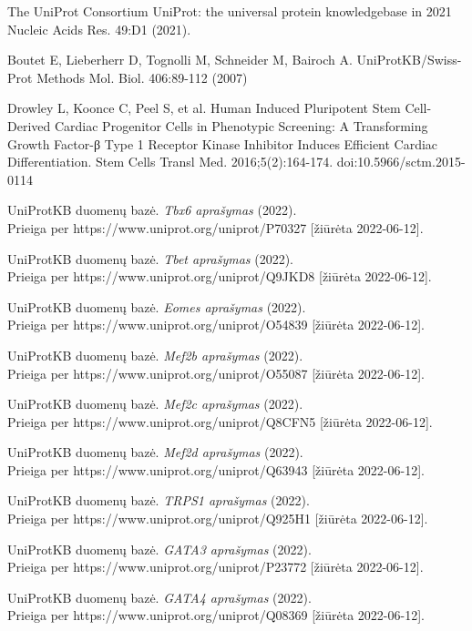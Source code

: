 \documentclass[12pt]{article}
\begin{document}
\begin{thebibliography}{99}
 The UniProt Consortium
UniProt: the universal protein knowledgebase in 2021
Nucleic Acids Res. 49:D1 (2021).

 Boutet E, Lieberherr D, Tognolli M,
Schneider M, Bairoch A. UniProtKB/Swiss-Prot
Methods Mol. Biol. 406:89-112 (2007)

 Drowley L, Koonce C, Peel S, et al.
Human Induced Pluripotent Stem Cell-Derived Cardiac Progenitor
Cells in Phenotypic Screening: A Transforming Growth Factor-β
Type 1 Receptor Kinase Inhibitor Induces Efficient Cardiac
Differentiation. Stem Cells Transl Med. 2016;5(2):164-174.
doi:10.5966/sctm.2015-0114

 UniProtKB duomenų bazė. \emph{Tbx6 aprašymas} (2022).\\
Prieiga per https://www.uniprot.org/uniprot/P70327 [žiūrėta 2022-06-12].

 UniProtKB duomenų bazė. \emph{Tbet aprašymas} (2022).\\
Prieiga per https://www.uniprot.org/uniprot/Q9JKD8 [žiūrėta 2022-06-12].

 UniProtKB duomenų bazė. \emph{Eomes aprašymas} (2022).\\
Prieiga per https://www.uniprot.org/uniprot/O54839 [žiūrėta 2022-06-12].

 UniProtKB duomenų bazė. \emph{Mef2b aprašymas} (2022).\\
Prieiga per https://www.uniprot.org/uniprot/O55087 [žiūrėta 2022-06-12].

 UniProtKB duomenų bazė. \emph{Mef2c aprašymas} (2022).\\
Prieiga per https://www.uniprot.org/uniprot/Q8CFN5 [žiūrėta 2022-06-12].

 UniProtKB duomenų bazė. \emph{Mef2d aprašymas} (2022).\\
Prieiga per https://www.uniprot.org/uniprot/Q63943 [žiūrėta 2022-06-12].

 UniProtKB duomenų bazė. \emph{TRPS1 aprašymas} (2022).\\
Prieiga per https://www.uniprot.org/uniprot/Q925H1 [žiūrėta 2022-06-12].

 UniProtKB duomenų bazė. \emph{GATA3 aprašymas} (2022).\\
Prieiga per https://www.uniprot.org/uniprot/P23772 [žiūrėta 2022-06-12].

 UniProtKB duomenų bazė. \emph{GATA4 aprašymas} (2022).\\
Prieiga per https://www.uniprot.org/uniprot/Q08369 [žiūrėta 2022-06-12].


\end{thebibliography}
\end{document}
